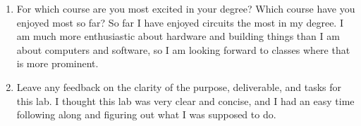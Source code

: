 \begin{enumerate}
    \item For which course are you most excited in your degree? Which course have you enjoyed most so far?
    \newline \newline So far I have enjoyed circuits the most in my degree. I am much more enthusiastic about hardware and building things than I am about computers and software, so I am looking forward to classes where that is more prominent.
    \newline \item Leave any feedback on the clarity of the purpose, deliverable, and tasks for this lab.
    \newline \newline I thought this lab was very clear and concise, and I had an easy time following along and figuring out what I was supposed to do. 
\end{enumerate}